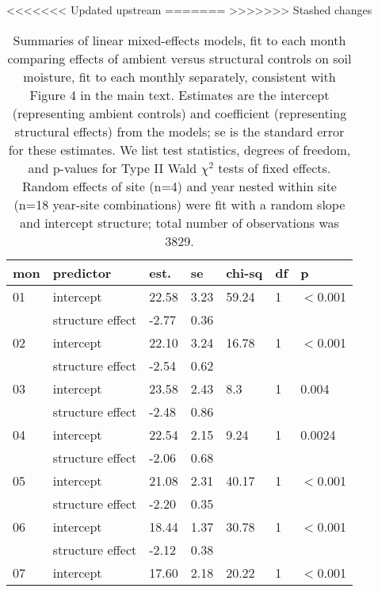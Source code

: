 \documentclass{article}
\begin{document}
<<<<<<< Updated upstream
=======
>>>>>>> Stashed changes
\begin{table}[ht]
\centering
\caption{Summaries of linear mixed-effects models, fit to each month comparing effects of ambient versus structural controls on soil moisture, fit to each monthly separately, consistent with Figure 4 in the main text. Estimates are the intercept (representing ambient controls) and coefficient (representing structural effects) from the models; se is the standard error for these estimates. We list test statistics, degrees of freedom, and p-values for Type II Wald $\chi^{2}$ tests of fixed effects. Random effects of site (n=4) and year nested within site (n=18 year-site combinations) were fit with a random slope and intercept structure; total number of observations was 3829.} 
\label{table:shamamb_soilmoism}
\begin{tabular}{|p{}|p{}|p{}p{}p{}p{}p{}|}
  \hline
mon & predictor & est. & se & chi-sq & df & p \\ 
  \hline
01 & intercept & 22.58 & 3.23 & 59.24 & 1 & $<$0.001 \\ 
    & structure effect & -2.77 & 0.36 &  &  &  \\ 
   \hline
02 & intercept & 22.10 & 3.24 & 16.78 & 1 & $<$0.001 \\ 
    & structure effect & -2.54 & 0.62 &  &  &  \\ 
   \hline
03 & intercept & 23.58 & 2.43 & 8.3 & 1 & 0.004 \\ 
    & structure effect & -2.48 & 0.86 &  &  &  \\ 
   \hline
04 & intercept & 22.54 & 2.15 & 9.24 & 1 & 0.0024 \\ 
    & structure effect & -2.06 & 0.68 &  &  &  \\ 
   \hline
05 & intercept & 21.08 & 2.31 & 40.17 & 1 & $<$0.001 \\ 
    & structure effect & -2.20 & 0.35 &  &  &  \\ 
   \hline
06 & intercept & 18.44 & 1.37 & 30.78 & 1 & $<$0.001 \\ 
    & structure effect & -2.12 & 0.38 &  &  &  \\ 
   \hline
07 & intercept & 17.60 & 2.18 & 20.22 & 1 & $<$0.001 \\ 

\end{tabular}
\end{table}
\end{document}
